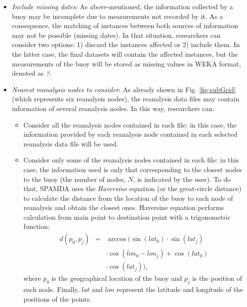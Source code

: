 \documentclass[energies,article,submit,moreauthors,pdftex]{Definitions/mdpi}
\begin{document}
\begin{itemize}
					\item \textit{Include missing dates}: As above-mentioned, the information collected by a buoy may be incomplete due to measurements not recorded by it. As a consequence, the matching of instances between both sources of information may not be possible (missing dates). In that situation, researchers can consider two options: 1) discard the instances affected or 2) include them. In the latter case, the final datasets will contain the affected instances, but the measurements of the buoy will be stored as missing values in WEKA format, denoted as \guillemotleft\textit{?}\guillemotright.
					
					\item \textit{Nearest reanalysis nodes to consider}: As already shown in Fig. \ref{fig:subGrid} (which represents six reanalysis nodes), the reanalysis data files may contain information of several reanalysis nodes. In this way, researchers can:
					
						\begin{itemize}
							
							\item Consider all the reanalysis nodes contained in each file: in this case, the information provided by each reanalysis node contained in each selected reanalysis data file will be used.
							
							\item Consider only some of the reanalysis nodes contained in each file: in this case, the information used is only that corresponding to the closest nodes to the buoy (the number of nodes, $N$, is indicated by the user). To do that, SPAMDA uses the \textit{Haversine} equation \cite{Haversine_2009} (or the great-circle distance) to calculate the distance from the location of the buoy to each node of reanalysis and obtain the closest ones. Haversine equation performs calculation from main point to destination point with a trigonometric function:
								\begin{eqnarray}
									\label{eq:Haversine}
									d(p_0,p_j) & = & \arccos(\sin(lat_0)\cdot \sin(lat_j) \nonumber \\
									& & \cdot \cos(lon_0-lon_j) + \cos(lat_0) \\
									& & \cdot \cos(lat_j)), \nonumber 
								\end{eqnarray}
							where $p_0$ is the geographical location of the buoy and $p_j$ is the position of each node. Finally, $lat$ and $lon$ represent the latitude and longitude of the positions of the points.
						\end{itemize}
					

\end{itemize}
\end{document}
